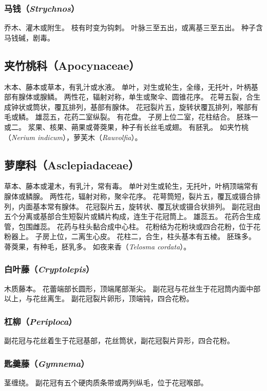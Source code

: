 \documentclass[11pt]{article}
\begin{document}
\begin{sloppypar}
\subsubsection{马钱（\textit{Strychnos}）}
乔木、灌木或附生。
枝有时变为钩刺。
叶脉三至五出，或离基三至五出。
种子含马钱碱，剧毒。

\subsection{夹竹桃科（Apocynaceae）}
木本、藤本或草本，有乳汁或水液。
单叶，对生或轮生，全缘，无托叶，叶柄基部有腺体或腺鳞。
两性花，辐射对称，单生或聚伞、圆锥花序。
花萼五裂，合生成钟状或筒状，覆瓦排列，基部有腺体。
花冠裂片五，旋转状覆瓦排列，喉部有毛或鳞。
雄蕊五，花药二室纵裂。
有花盘。
子房上位二室，花柱结合。
胚珠一或二。
浆果、核果、蒴果或蓇葖果，种子有长丝毛或翅。
有胚乳。
如夹竹桃（\textit{Nerium indicum}），萝芙木（\textit{Rauvolfia}）。

\subsection{萝摩科（Asclepiadaceae）}
草本、藤本或灌木，有乳汁，常有毒。
单叶对生或轮生，无托叶，叶柄顶端常有腺体或鳞腺。
两性花，辐射对称，聚伞花序。
花萼筒短，裂片五，覆瓦或镊合排列，内面基本常有腺体。
花冠裂片五，旋转状、覆瓦状或镊合状排列。
副花冠由五个分离或基部合生短裂片或鳞片构成，连生于花冠筒上。
雄蕊五。
花药合生成管，包围雌蕊。
花药与柱头黏合成中心柱。
花粉结为花粉块或四合花粉，位于花粉器上。
子房上位，二离生心皮。
花柱二，合生，柱头基本有五棱。
胚珠多。
蓇葖果，有种毛，胚乳多。
如夜来香（\textit{Telosma cordata}）。

\subsubsection{白叶藤（\textit{Cryptolepis}）}
木质藤本。
花蕾端部长圆形，顶端尾部渐尖。
副花冠与花丝生于花冠筒内面中部以上，与花丝离生。
副花冠裂片卵形，顶端钝，四合花粉。

\subsubsection{杠柳（\textit{Periploca}）}
副花冠与花丝着生于花冠基部，花丝筒状，副花冠裂片异形，四合花粉。

\subsubsection{匙羹藤（\textit{Gymnema}）}
茎缠绕。
副花冠有五个硬肉质条带或两列纵毛，位于花冠喉部。


\end{sloppypar}
\end{document}

